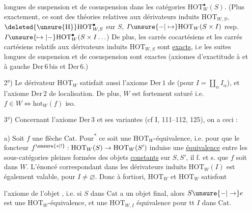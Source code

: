 longues de suspension et de cosuspension dans
les catégories $\mathrm{HOT}_{W}^{\bullet}(S)$. (Plus exactement, ce sont
des théories relatives aux dérivateurs induits
$\mathrm{HOT}_{W,S}$, $\deleted{\unsure{\mathrm H}}\mathrm{HOT}_{W,S}^{\bullet}$ sur $S$, $I\unsure{-|\mapsto}\mathrm{HOT}_{W}(S\times I)$ resp.
$I\unsure{\mapsto|-}\mathrm{HOT}_{W}^{\bullet}(S\times I\ldots$) De plus, les carrés
cocartésiens et les carrés cartésiens relatifs
aux dérivateurs induits $\mathrm{HOT}_{W,S}$ sont
\uline{exacts}, i.e les suites  longues
de suspension et de cosuspension sont
exactes (axiomes d'exactitude à  
et à gauche $\mathrm{Der}\,6\,\mathrm{bis}$ et $\mathrm{Der}\,6$.)

2°) Le dérivateur $\mathrm{HOT}_{W}$ satisfait aussi
l'axiome $\mathrm{Der}\,1$ de 
(pour $I=\coprod_{\alpha}I_{\alpha}$),
 et l'axiome $\mathrm{Der}\,2$ de localisation.
De plus, $W$ est fortement saturé i.e. $f\in W\Longleftrightarrow\mathrm{hot}_{W}(f)$ iso.

3°) Concernant l'axiome $\mathrm{Der}\,3$ et ses variantes
(cf I,  111--112, 125), on a  ceci :

 a) 
Soit $f$  une flèche  $\mathrm{Cat}$. Pour\textsuperscript{*}
 ce soit une $\mathrm{HOT}_{W}$-équivalence, i.e. pour
que le foncteur $f^{\unsure{*|!}}:\mathrm{HOT}_{W}(S)\to\mathrm{HOT}_{W}(S')$ induise une
\uline{équivalence} entre les sous-catégories pleines
formées des  objets \uline{constants} sur $S,S'$, il f. et
s. que $f$ soit dans $W$.  L'énoncé correspondant dans les dérivateurs induits $\mathrm{HOT}_{W}(I)$
est  également valable, pour $I\ne\varnothing$. Donc
à fortiori, $\mathrm{HOT}_{W}$ et $\mathrm{HOT}_{W}$ satisfont

l'axiome de l'objet , i.e.  si
$S$ dans $\mathrm{Cat}$ a un objet final, alors $S\unsure{-|\to}e$
est une $\mathrm{HOT}_{W}$-équivalence, et  une
$\mathrm{HOT}_{W,I}$ équivalence pour tt $I$ dans $\mathrm{Cat}$.

